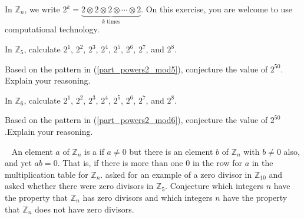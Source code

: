 \begin{exer}[\exerE] %
\label{exer_powers_modn_examples}
    In $\mathbb{Z}_n$, we write $2^k=\underbrace{2 \otimes 2 \otimes 2 \otimes \cdots \otimes 2}_{k \text{ times}}.$  On this exercise, you are welcome to use computational technology.
        \begin{apart}
            \item \label{part_powers2_mod5} In $\mathbb{Z}_5$, calculate $2^1$, $2^2$, $2^3$, $2^4$, $2^5$, $2^6$, $2^7$, and $2^8$.  

            \item Based on the pattern in (\ref{part_powers2_mod5}), conjecture the value of $2^{50}$. Explain your reasoning.
            \item \label{part_powers2_mod6} In $\mathbb{Z}_6$, calculate $2^1$, $2^2$, $2^3$, $2^4$, $2^5$, $2^6$, $2^7$, and $2^8$.  
            \item Based on the pattern in (\ref{part_powers2_mod6}), conjecture the value of $2^{50}$.Explain your reasoning.
        \end{apart}
\end{exer}

\begin{exer}[\exerE] %
\label{exer_zero_div_modn_conj}  
~
    An element $a$ of $\mathbb{Z}_n$ is a  if $a \neq 0$ but there is an element $b$ of $\mathbb{Z}_n$ with $b \neq 0$ also, and yet $ab = 0$. That is, if there is more than one 0 in the row for $a$ in the multiplication table for $\mathbb{Z}_n$.  asked for an example of a zero divisor in $\mathbb{Z}_{10}$ and asked whether there were zero divisors in $\mathbb{Z}_5$.  Conjecture which integers $n$ have the property that $\mathbb{Z}_n$ has zero divisors and which integers $n$ have the property that $\mathbb{Z}_n$ does not have zero divisors.
\end{exer}

